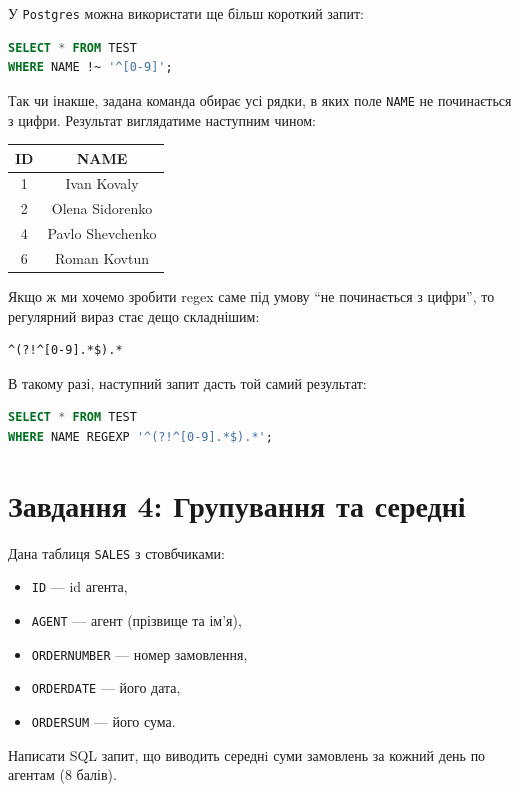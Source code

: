 \documentclass{hw_template}
\begin{document}
У \texttt{Postgres} можна використати ще більш короткий запит:
\begin{lstlisting}[language=SQL]
SELECT * FROM TEST
WHERE NAME !~ '^[0-9]';
\end{lstlisting}

Так чи інакше, задана команда обирає усі рядки, в яких поле \texttt{NAME} не
починається з цифри. Результат виглядатиме наступним чином:

\begin{center}
    \begin{tabular}{|c|c|}
        \hline
        ID & NAME \\
        \hline
        1 & Ivan Kovaly \\
        2 & Olena Sidorenko \\
        4 & Pavlo Shevchenko \\
        6 & Roman Kovtun \\
        \hline
    \end{tabular}
\end{center}

Якщо ж ми хочемо зробити regex саме під умову ``не починається з цифри'', то
регулярний вираз стає дещо складнішим: 
\begin{lstlisting}
^(?!^[0-9].*$).*
\end{lstlisting}

В такому разі, наступний запит дасть той самий результат:
\begin{lstlisting}[language=SQL]
SELECT * FROM TEST
WHERE NAME REGEXP '^(?!^[0-9].*$).*';
\end{lstlisting}

\newpage

\section{Завдання 4: Групування та середні}

\begin{problem}
    Дана таблиця \texttt{SALES} з стовбчиками: 
    \begin{itemize}
        \item \texttt{ID} --- id агента,
        \item \texttt{AGENT} --- агент (прізвище та ім’я),
        \item \texttt{ORDERNUMBER} --- номер замовлення,
        \item \texttt{ORDERDATE} --- його дата,
        \item \texttt{ORDERSUM} --- його сума.
    \end{itemize}
    Написати SQL запит, що виводить середнi суми замовлень за кожний день по
    агентам (8 балів).
\end{problem}
\end{document}
